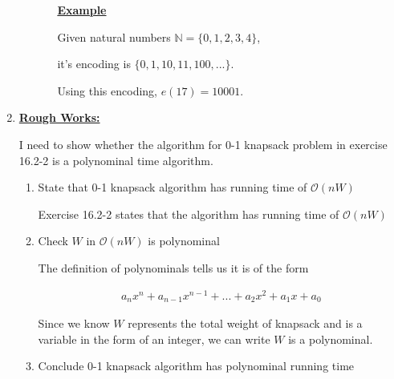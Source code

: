 \documentclass[12pt]{article}
\begin{document}
\begin{enumerate}[1.]
\begin{itemize}
\begin{itemize}
            \bigskip

            \underline{\textbf{Example}}

            \bigskip

            Given natural numbers $\mathbb{N} = \{0,1,2,3,4\}$,

            \bigskip

            it's encoding is $\{0,1,10,11,100, ...\}$.

            \bigskip

            Using this encoding, $e(17) = 10001$.

        \end{itemize}
    \end{itemize}

    \item

    \bigskip

    \underline{\textbf{Rough Works:}}

    I need to show whether the algorithm for 0-1 knapsack problem in exercise 16.2-2
    is a polynominal time algorithm.

    \begin{enumerate}[1.]
        \item State that 0-1 knapsack algorithm has running time of $\mathcal{O}(nW)$

        \begin{mdframed}
        Exercise 16.2-2 states that the algorithm has running time of $\mathcal{O}(nW)$
        \end{mdframed}

        \item Check $W$ in $\mathcal{O}(nW)$ is polynominal

        \begin{mdframed}
        The definition of polynominals tells us it is of the form

        \begin{align}
            a_nx^n + a_{n-1}x^{n-1} + ... + a_2x^2 + a_1x + a_0
        \end{align}

        Since we know $W$ represents the total weight of knapsack and is a variable in the form of an integer,
        we can write $W$ is a polynominal.

        \end{mdframed}

        \item Conclude 0-1 knapsack algorithm has polynominal running time


\end{enumerate}
\end{enumerate}
\end{document}
